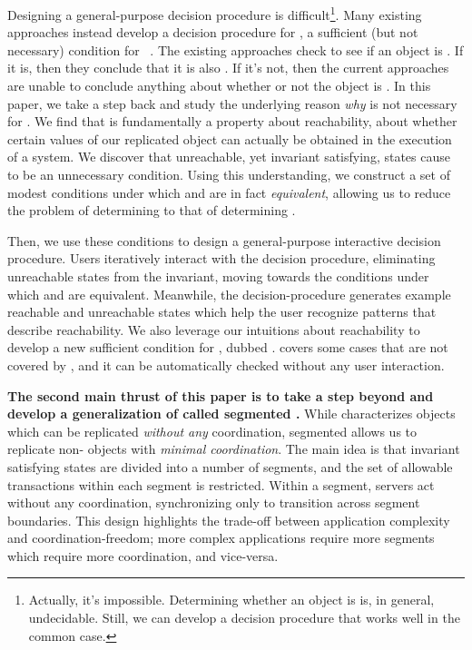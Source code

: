 Designing a general-purpose \invariantconfluence{} decision procedure is
difficult\footnote{Actually, it's impossible. Determining whether an object is
\invariantconfluent{} is, in general, undecidable. Still, we can develop a
decision procedure that works well in the common case.}. Many existing
approaches instead develop a decision procedure for \invariantclosure{}, a
sufficient (but not necessary) condition for
\invariantconfluence{}~\cite{li2012making, li2014automating}. The existing
approaches check to see if an object is \invariantclosed{}. If it is, then they
conclude that it is also \invariantconfluent{}. If it's not, then the current
approaches are unable to conclude anything about whether or not the object is
\invariantconfluent{}. In this paper, we take a step back and study the
underlying reason \emph{why} \invariantclosure{} is not necessary for
\invariantconfluence{}. We find that \invariantconfluence{} is fundamentally a
property about reachability, about whether certain values of our replicated
object can actually be obtained in the execution of a system. We discover that
unreachable, yet invariant satisfying, states cause \invariantclosure{} to be
an unnecessary condition. Using this understanding, we construct a set of
modest conditions under which \invariantclosure{} and \invariantconfluence{}
are in fact \emph{equivalent}, allowing us to reduce the problem of determining
\invariantconfluence{} to that of determining \invariantclosure{}.

Then, we use these conditions to design a general-purpose interactive
\invariantconfluence{} decision procedure. Users iteratively interact with the
decision procedure, eliminating unreachable states from the invariant, moving
towards the conditions under which \invariantclosure{} and
\invariantconfluence{} are equivalent. Meanwhile, the decision-procedure
generates example reachable and unreachable states which help the user
recognize patterns that describe reachability. We also leverage our intuitions
about reachability to develop a new sufficient condition for
\invariantconfluence{}, dubbed \mergereducibility. \Mergereducibility{} covers
some cases that are not covered by \invariantclosure{}, and it can be
automatically checked without any user interaction.

\textbf{The second main thrust of this paper is to take a step beyond
\invariantconfluence{} and develop a generalization of \invariantconfluence{}
called segmented \invariantconfluence{}.} While \invariantconfluence{}
characterizes objects which can be replicated \emph{without any} coordination,
segmented \invariantconfluence{} allows us to replicate
non-\invariantconfluent{} objects with \emph{minimal coordination}. The main
idea is that invariant satisfying states are divided into a number of segments,
and the set of allowable transactions within each segment is restricted.
Within a segment, servers act without any coordination, synchronizing only to
transition across segment boundaries. This design highlights the trade-off
between application complexity and coordination-freedom; more complex
applications require more segments which require more coordination, and
vice-versa.

